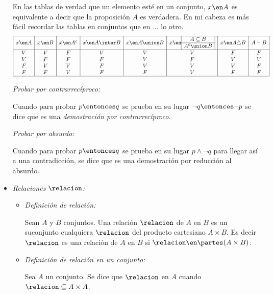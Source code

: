 \begin{itemize}[label={\tiny{}}]
        En las tablas de verdad que un elemento esté en un conjunto, $x \en A$ es equivalente a decir que la proposición $A$ es verdadera.
        En mi cabeza es más fácil recordar las tablas en conjuntos que en ... lo otro.
        \[
          \begin{array}{|c|c|c|c|c|c|c|c|}
            \hline
            x \en A & x \en B & x \en A^c & x \en A \inter B & x \en A \union B & x \en \subconjuntoYequivalente & x \en A \triangle B & A - B \\
            \hline
            V       & V       & F         & V                & V                & V                              & F                   & F     \\
            V       & F       & F         & F                & V                & F                              & V                   & V     \\
            F       & V       & V         & F                & V                & V                              & V                   & F     \\
            F       & F       & V         & F                & F                & V                              & F                   & F     \\
            \hline
          \end{array}
        \]

        \hypertarget{teoria-1:contrareciproco}{\textit{Probar por contrarrecíproco:}}
        Cuando para probar $p \entonces q$ se prueba en su lugar $\neg q \entonces \neg p$ se dice que es
        una \textit{demostración
          por contrarrecíproco}.\par

        \hypertarget{teoria-1:absurdo}{\textit{Probar por absurdo:}}
        Cuando para probar $p \entonces q$ se prueba en su lugar $p \land \neg q$ para llegar así
        a una contradicción, se dice que es una demostración por reducción al absurdo.

  \item \hypertarget{teoria-1:relaciones}{\textit{Relaciones $\relacion$:}}\par
        \begin{itemize}[label=\tiny{}]
          \item
                \textit{Definición de relación: }\par
                Sean $A$ y $B$ conjuntos. Una relación $\relacion$ de $A$ en $B$ es un suconjunto
                cualquiera $\relacion$ del producto cartesiano $A \times B$. Es decir $\relacion$ es una relación
                de $A$ en $B$ si $\relacion \en \partes(A \times B)$.
          \item
                \textit{Definición de relación en un conjunto: }\par
                Sea $A$ un conjunto. Se dice que $\relacion$ en $A$ cuando $\relacion \subseteq A \times A$.
        \end{itemize}


\end{itemize}
